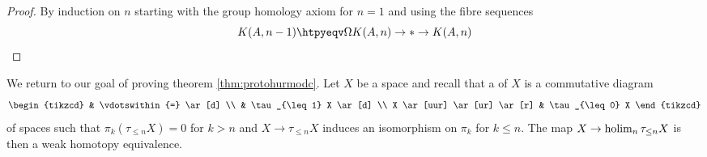 \begin{proof}
	By induction on $n$ starting with the group homology axiom for $n = 1$ and using the fibre sequences
	\begin{equation*}
		K(A, n - 1) \htpyeqv \Omega K(A, n) \to * \to K(A, n)
		\qedhere
	\end{equation*}
\end{proof}
We return to our goal of proving theorem \ref{thm:protohurmodc}.
Let $X$ be a space and recall that a  of $X$ is a commutative diagram
\begin{equation*}
	\begin{tikzcd}
			& \vdotswithin{=}
				\ar[d]
		\\
			& \tau_{\leq 1} X
				\ar[d]
		\\
		X
				\ar[uur]
				\ar[ur]
				\ar[r]
			& \tau_{\leq 0} X
	\end{tikzcd}
\end{equation*}
of spaces such that $\pi_k(\tau_{\leq n} X) = 0$ for $k > n$ and $X \to \tau_{\leq n} X$ induces an isomorphism on $\pi_k$ for $k \leq n$.
The map $X \to \operatorname*{holim}_n \tau_{\leq n} X$ is then a weak homotopy equivalence.

